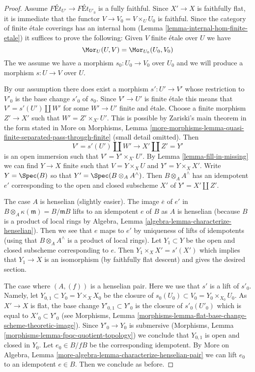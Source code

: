 \begin{proof}
Assume $\textit{F\'Et}_{U'} \longrightarrow \textit{F\'Et}_{U'_0}$
is a fully faithful. Since $X' \to X$ is faithfully flat, it is
immediate that the functor $V \to V_0 = V \times_U U_0$ is faithful.
Since the category of finite \'etale coverings has an internal hom
(Lemma \ref{lemma-internal-hom-finite-etale})
it suffices to prove the following: Given $V$ finite \'etale over $U$
we have
$$
\Mor_U(U, V) = \Mor_{U_0}(U_0, V_0)
$$
The we assume we have a morphism $s_0 : U_0 \to V_0$ over $U_0$ and we will
produce a morphism $s : U \to V$ over $U$.

\medskip\noindent
By our assumption there does exist a morphism $s' : U' \to V'$
whose restriction to $V'_0$ is the base change $s'_0$ of $s_0$.
Since $V' \to U'$ is finite \'etale this means that $V' = s'(U') \amalg W'$
for some $W' \to U'$ finite and \'etale.
Choose a finite morphism $Z' \to X'$ such that $W' = Z' \times_{X'} U'$.
This is possible by Zariski's main theorem in the form stated in
More on Morphisms, Lemma
\ref{more-morphisms-lemma-quasi-finite-separated-pass-through-finite}
(small detail omitted).
Then
$$
V' = s'(U') \amalg W' \longrightarrow X' \amalg Z' = Y'
$$
is an open immersion such that $V' = Y' \times_{X'} U'$.
By Lemma \ref{lemma-fill-in-missing} we can find $Y \to X$ finite
such that $V = Y \times_X U$ and $Y' = Y \times_X X'$.
Write $Y = \Spec(B)$ so that $Y' = \Spec(B \otimes_A A^\wedge)$.
Then $B \otimes_A A^\wedge$ has an idempotent $e'$
corresponding to the open and closed subscheme $X'$ of $Y' = X' \amalg Z'$.

\medskip\noindent
The case $A$ is henselian (slightly easier). The image $\overline{e}$
of $e'$ in $B \otimes_A \kappa(\mathfrak m) = B/\mathfrak mB$ lifts to an
idempotent $e$ of $B$ as $A$ is henselian (because $B$ is a product of
local rings by Algebra, Lemma \ref{algebra-lemma-characterize-henselian}).
Then we see that $e$ maps to $e'$ by uniqueness of lifts of idempotents
(using that $B \otimes_A A^\wedge$ is a product of local rings).
Let $Y_1 \subset Y$ be the open and closed subscheme corresponding to $e$.
Then $Y_1 \times_X X' = s'(X')$ which implies that $Y_1 \to X$ is
an isomorphism (by faithfully flat descent) and gives the desired section.

\medskip\noindent
The case where $(A, (f))$ is a henselian pair. Here we use that $s'$ is
a lift of $s'_0$. Namely, let $Y_{0, 1} \subset Y_0 = Y \times_X X_0$
be the closure of $s_0(U_0) \subset V_0 = Y_0 \times_{X_0} U_0$.
As $X' \to X$ is flat, the base change $Y'_{0, 1} \subset Y'_0$
is the closure of $s'_0(U'_0)$ which is equal to $X'_0 \subset Y'_0$
(see Morphisms, Lemma
\ref{morphisms-lemma-flat-base-change-scheme-theoretic-image}).
Since $Y'_0 \to Y_0$ is submersive
(Morphisms, Lemma \ref{morphisms-lemma-fpqc-quotient-topology})
we conclude that $Y_{0, 1}$ is open and closed in $Y_0$.
Let $e_0 \in B/fB$ be the corresponding idempotent.
By More on Algebra, Lemma
\ref{more-algebra-lemma-characterize-henselian-pair}
we can lift $e_0$ to an idempotent $e \in B$.
Then we conclude as before.
\end{proof}

